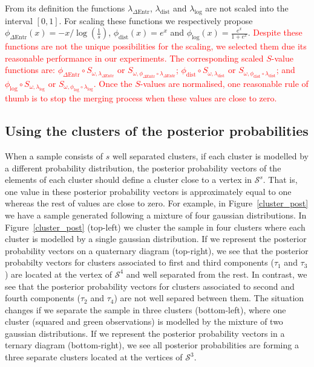 \documentclass[submit]{smj}
\theoremstyle{definition}
\begin{document}
From its definition the functions $\lambda_{\Delta\text{Entr}}$, $\lambda_{\text{dist}}$ and 
$\lambda_{\log}$ are not scaled into the interval $\left[0,1\right]$. For scaling these functions we respectively propose  $\phi_{\Delta\text{Entr}}(x) = -x/{\log(\frac{1}{s})}$, $\phi_{\text{dist}}(x) = e^x$ and $\phi_{\log}(x) = \frac{e^x}{1+e^x}$. \textcolor{red}{Despite these functions are not the unique possibilities for the scaling, we selected them due its reasonable performance in our experiments. The corresponding scaled $S$-value functions are: 
  $\phi_{\Delta\text{Entr}} \circ S_{\omega, \lambda_{\Delta\text{Entr}}}$ or $S_{\omega, \phi_{\Delta\text{Entr}} \circ \lambda_{\Delta\text{Entr}}}$; $\phi_{\text{dist}} \circ S_{\omega, \lambda_{\text{dist}}}$ or $S_{\omega, \phi_{\text{dist}} \circ \lambda_{\text{dist}}}$; and $\phi_{\log} \circ S_{\omega, \lambda_{\log}}$ or $S_{\omega, \phi_{\log} \circ \lambda_{\log}}$. Once the $S$-values are normalised, one reasonable rule of thumb is to stop the merging process when these values are close to zero.}

\subsection{Using the clusters of the posterior probabilities}\label{coda_clusters}

When a sample consists of $s$ well separated clusters, if each cluster is modelled by a different probability distribution, the posterior probability vectors of the elements of each cluster should define a cluster close to a vertex in $\mathcal{S}^s$. That is, one value in these posterior probability vectors is approximately equal to one whereas the rest of values are close to zero. For example, in Figure~\ref{cluster_post} we have a sample generated following a mixture of four gaussian distributions. In Figure~\ref{cluster_post} (top-left) we cluster the sample in four clusters where each cluster is modelled by a single gaussian distribution. If we represent the posterior probability vectors on a quaternary diagram (top-right), we see that the posterior probabilty vectors for clusters associated to first and third components ($\tau_1$ and $\tau_3$) are located at the vertex of $\mathcal{S}^4$ and well separated from the rest. In contrast, we see that the posterior probability vectors for clusters associated to second and fourth components ($\tau_2$ and $\tau_4$) are not well separed between them. The situation changes if we separate the sample in three clusters (bottom-left), where one cluster (squared and green observations) is modelled by the mixture of two gaussian distributions. If we represent the posterior probability vectors in a ternary diagram (bottom-right), we see all posterior probabilities are forming a three separate clusters located at the vertices of $\mathcal{S}^3$. 
\end{document}
